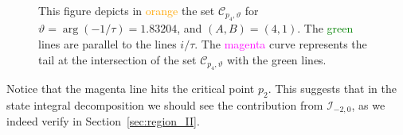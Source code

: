 \documentclass[12pt,reqno]{amsart}
\theoremstyle{definition}
\def\calI{\mathcal I}
\def\calC{\mathcal C}
\renewcommand{\=}{\;=\;}
\begin{document}
\begin{figure}[ht]
\begin{tiny}
\end{tiny}
\caption{This figure depicts in \textcolor{orange}{orange} the set $\calC_{p_4,\vartheta}$ for $\vartheta=\arg(-1/\tau)=1.83204$, and $(A,B)=(4,1)$. The \textcolor{green}{green} lines are parallel to the lines $i/\tau$. The \textcolor{magenta}{magenta} curve represents the tail at the intersection of the set $\calC_{p_4,\vartheta}$ with the green lines.}
\label{fig:saddle.A4B1.I-II}
\end{figure}
Notice that the magenta line hits the critical point $p_2$. This suggests that in the state integral decomposition we should see the contribution from $\calI_{-2,0}$, as we indeed verify in Section~\ref{sec:region_II}.
\end{document}
